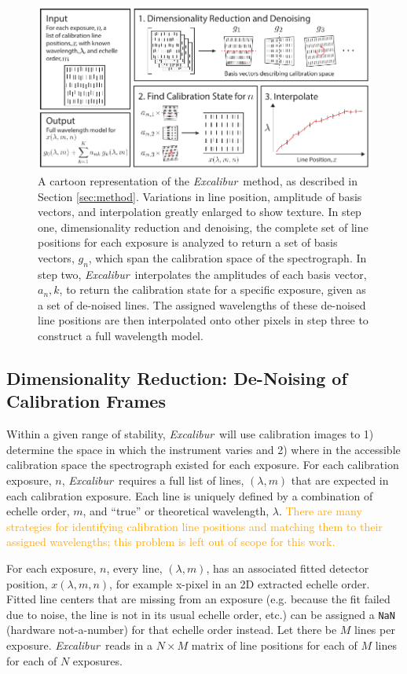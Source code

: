 \documentclass[modern]{aastex63}
\newcommand{\project}[1]{\textsl{#1}}
\newcommand{\name}{\project{Excalibur}}
\newcommand{\code}[1]{\texttt{#1}}
\newcommand{\lz}[1]{\textcolor{orange}{#1}}
\begin{document}
\begin{figure}[h]
\centering
\includegraphics[width=\textwidth]{Figures/methodCartoon.pdf}
\caption{A cartoon representation of the \name\ method, as described in Section \ref{sec:method}.  Variations in line position, amplitude of basis vectors, and interpolation greatly enlarged to show texture.  In step one, dimensionality reduction and denoising, the complete set of line positions for each exposure is analyzed to return a set of basis vectors, $g_n$, which span the calibration space of the spectrograph.  In step two, \name\ interpolates the amplitudes of each basis vector, $a_n,k$, to return the calibration state for a specific exposure, given as a set of de-noised lines.  The assigned wavelengths of these de-noised line positions are then interpolated onto other pixels in step three to construct a full wavelength model.}
\label{fig:testHists}
\end{figure} 

\subsection{Dimensionality Reduction: De-Noising of Calibration Frames} \label{sec:denoising}
Within a given range of stability, \name\ will use calibration images to  1) determine the space in which the instrument varies and 2) where in the accessible calibration space the spectrograph existed for each exposure.  For each calibration exposure, $n$, \name\ requires a full list of lines, $(\lambda,m)$ that are expected in each calibration exposure.  Each line is uniquely defined by a combination of echelle order, $m$, and ``true'' or theoretical wavelength, $\lambda$.  \lz{There are many strategies for identifying calibration line positions and matching them to their assigned wavelengths; this problem is left out of scope for this work.}

For each exposure, $n$, every line, $(\lambda,m)$, has an associated fitted detector position, $x(\lambda,m,n)$, for example x-pixel in an 2D extracted echelle order.  Fitted line centers that are missing from an exposure (e.g. because the fit failed due to noise, the line is not in its usual echelle order, etc.) can be assigned a \code{NaN} (hardware not-a-number) for that echelle order instead.  Let there be $M$ lines per exposure.  \name\ reads in a $N \times M$ matrix of line positions for each of $M$ lines for each of $N$ exposures.
\end{document}
